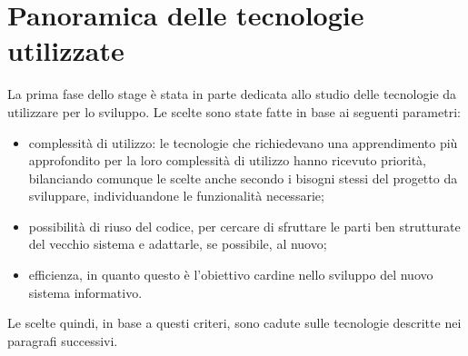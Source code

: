 \section{Panoramica delle tecnologie utilizzate}
La prima fase dello stage \`e stata in parte dedicata allo studio delle tecnologie da utilizzare per lo sviluppo. Le scelte sono state fatte in base ai seguenti parametri:
\begin{itemize}
  \item complessit\`a di utilizzo: le tecnologie che richiedevano una apprendimento pi\`u approfondito per la loro 
  complessit\`a di utilizzo hanno ricevuto priorit\`a, bilanciando comunque le scelte anche secondo i bisogni stessi del
progetto da sviluppare, individuandone le funzionalit\`a necessarie;
  \item possibilit\`a di riuso del codice, per cercare di sfruttare le parti ben strutturate del vecchio sistema e adattarle, se possibile, al nuovo;
  \item efficienza, in quanto questo \`e l'obiettivo cardine nello sviluppo del nuovo sistema informativo.
\end{itemize}
\noindent
Le scelte quindi, in base a questi criteri, sono cadute sulle tecnologie descritte nei paragrafi successivi.

